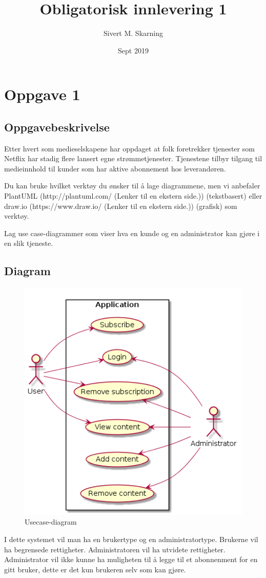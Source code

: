 \documentclass{article}
\title{Obligatorisk innlevering 1}
\author{Sivert M. Skarning}
\date{Sept 2019}
\begin{document}
\maketitle
\clearpage
\tableofcontents
\clearpage
\section{Oppgave 1}
\subsection{Oppgavebeskrivelse}
Etter hvert som medieselskapene har oppdaget at folk foretrekker tjenester som Netflix har stadig flere lansert egne strømmetjenester. Tjenestene tilbyr tilgang til medieinnhold til kunder som har aktive abonnement hos leverandøren. 

Du kan bruke hvilket verktøy du ønsker til å lage diagrammene, men vi anbefaler PlantUML (http://plantuml.com/ (Lenker til en ekstern side.)) (tekstbasert) eller draw.io (https://www.draw.io/ (Lenker til en ekstern side.)) (grafisk) som verktøy.

Lag use case-diagrammer som viser hva en kunde og en administrator kan gjøre i en slik tjeneste.
\subsection{Diagram}
\begin{figure}[h]
\centering
\includegraphics[scale=0.5]{images/oppgave1.png}
\caption{Usecase-diagram}
\label{fig:oppgave1.png}
\end{figure}

I dette systemet vil man ha en brukertype og en administratortype. Brukerne vil ha begrensede rettigheter. Administratoren vil ha utvidete rettigheter. Administrator vil ikke kunne ha muligheten til å legge til et abonnenment for en gitt bruker, dette er det kun brukeren selv som kan gjøre.
\end{document}
